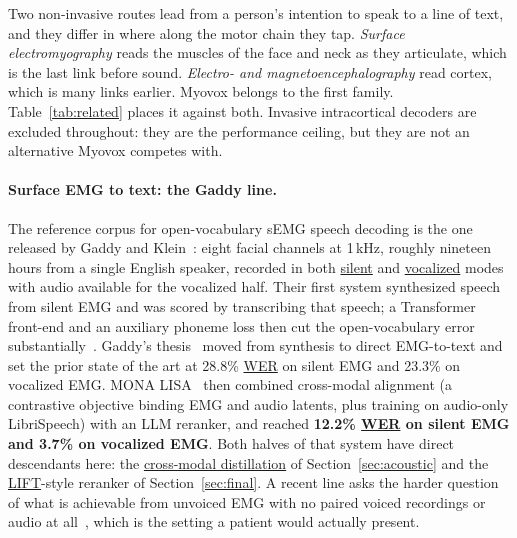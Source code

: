\documentclass{article}
\DeclareRobustCommand{\glref}[2]{\hyperlink{gl:#1}{\textcolor{glosslink}{#2}}}
\DeclareRobustCommand{\wer}{\glref{wer}{WER}}
\begin{document}
Two non-invasive routes lead from a person's intention to speak to a line of text, and they differ in
where along the motor chain they tap. \emph{Surface electromyography} reads the muscles of the face
and neck as they articulate, which is the last link before sound. \emph{Electro- and
magnetoencephalography} read cortex, which is many links earlier. Myovox belongs to the first family.
Table~\ref{tab:related} places it against both. Invasive intracortical decoders are excluded
throughout: they are the performance ceiling, but they are not an alternative Myovox competes with.

\paragraph{Surface EMG to text: the Gaddy line.}
The reference corpus for open-vocabulary sEMG speech decoding is the one released by Gaddy and
Klein~\citep{gaddy2020digital}: eight facial channels at 1\,kHz, roughly nineteen hours from a single
English speaker, recorded in both \glref{silent}{silent} and \glref{vocalized}{vocalized} modes with
audio available for the vocalized half. Their first system synthesized speech from silent EMG and was
scored by transcribing that speech; a Transformer front-end and an auxiliary phoneme loss then cut the
open-vocabulary error substantially~\citep{gaddy2021improved}. Gaddy's thesis~\citep{gaddy2022thesis}
moved from synthesis to direct EMG-to-text and set the prior state of the art at 28.8\% \wer{} on
silent EMG and 23.3\% on vocalized EMG. MONA LISA~\citep{benster2024mona} then combined cross-modal
alignment (a contrastive objective binding EMG and audio latents, plus training on audio-only
LibriSpeech) with an LLM reranker, and reached \textbf{12.2\% \wer{} on silent EMG and 3.7\% on
vocalized EMG}. Both halves of that system have direct descendants here: the
\glref{crossmodal}{cross-modal distillation} of Section~\ref{sec:acoustic} and the
\glref{lift}{LIFT}-style reranker of Section~\ref{sec:final}. A recent line asks the harder
question of what is achievable from unvoiced EMG with no paired voiced recordings or audio at
all~\citep{mohapatra2025llms}, which is the setting a patient would actually present.
\end{document}
